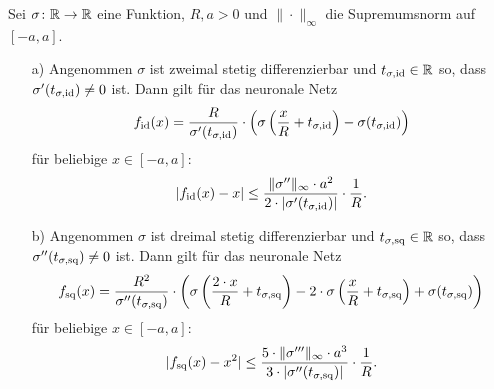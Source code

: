 \begin{lem}
  \label{lem:1}
  Sei $\sigma \colon \mathbb{R} \to \mathbb{R}$ eine Funktion, $R, a > 0$ und $\|\cdot\|_{\infty}$ die Supremumsnorm auf $[-a,a]$.
  \begin{itemize}
  \item[a)] Angenommen $\sigma$ ist zweimal stetig differenzierbar und $t_{\sigma,\mathrm{id}} \in \mathbb{R}$ so, dass $\sigma'(t_{\sigma, \mathrm{id}}) \neq 0$ ist. Dann gilt für das neuronale Netz
  $$ f_{\mathrm{id}}(x) = \frac{R}{\sigma'(t_{\sigma, \mathrm{id}})} \cdot \left(\sigma\left(\frac{x}{R} + t_{\sigma, \mathrm{id}}\right) - \sigma(t_{\sigma, \mathrm{id}})\right)$$
  für beliebige $x \in [-a, a]\colon$ 
  $$ |f_{\mathrm{id}}(x) - x| \leq \frac{\|\sigma''\|_{\infty} \cdot a^2}{2 \cdot |\sigma'(t_{\sigma, \mathrm{id}})|} \cdot \frac{1}{R}.$$
  \item[b)] Angenommen $\sigma$ ist dreimal stetig differenzierbar und $t_{\sigma,\mathrm{sq}} \in \mathbb{R}$ so, dass $\sigma''(t_{\sigma, \mathrm{sq}}) \neq 0$ ist. Dann gilt für das neuronale Netz
  $$ f_{\mathrm{sq}}(x) = \frac{R^2}{\sigma''(t_{\sigma, \mathrm{sq}})} \cdot \left(\sigma\left(\frac{2 \cdot x}{R} + t_{\sigma, \mathrm{sq}}\right) - 2 \cdot \sigma\left(\frac{x}{R} + t_{\sigma, \mathrm{sq}}\right)+ \sigma(t_{\sigma, \mathrm{sq}})\right)$$
  für beliebige $x \in [-a, a]\colon$ 
  $$ |f_{\mathrm{sq}}(x) - x^2| \leq \frac{5 \cdot \|\sigma'''\|_{\infty} \cdot a^3}{3 \cdot |\sigma''(t_{\sigma, \mathrm{sq}})|} \cdot \frac{1}{R}.$$
  \end{itemize}
\end{lem}
